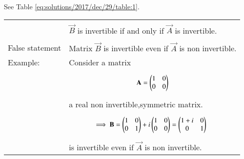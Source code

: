See Table \ref{eq:solutions/2017/dec/29/table:1}.

\onecolumn
\begin{longtable}{|l|l|}
\hline
\multirow{3}{*}{} & \\
Statement 1. &$\vec{B}$ is invertible if and only if $\vec{A}$ is  invertible.\\
\hline
& \\
False statement& Matrix $\vec{B}$ is invertible even if $\vec{A}$ is non invertible.\\
\hline
Example:&Consider a matrix \\&\parbox{12cm}{\begin{align}
 \mathbf{A}=\begin{pmatrix}
1 &0 \\
0&0\end{pmatrix}\label{eq:solutions/2017/dec/29/eq1}\end{align}}\\& a real non invertible,symmetric matrix.\\&\parbox{12cm}{\begin{align}
&\implies\mathbf{B}=\begin{pmatrix}1 & 0\\ 0 & 1\end{pmatrix}+i\begin{pmatrix}1 & 0\\ 0 & 0\end{pmatrix}=\begin{pmatrix}1+i & 0\\ 0 & 1  \end{pmatrix}\label{eq:solutions/2017/dec/29/eq2}\end{align}}\\ 

&is invertible even if $\vec{A}$ is non invertible.\\
\hline


\end{longtable}
